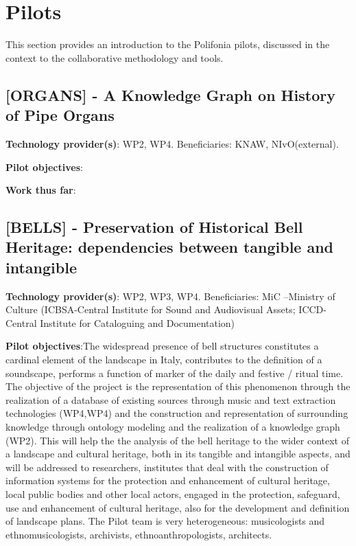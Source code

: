 \chapter{Pilots}\label{ch:pilot}
This section provides an introduction to the Polifonia pilots, discussed in the context to the collaborative methodology and tools.

\section{[ORGANS] - A Knowledge Graph on History of Pipe Organs}\label{sec:pilot:organs}
\textbf{Technology provider(s)}: WP2, WP4. Beneficiaries: KNAW, NIvO(external).

\textbf{Pilot objectives}:

\textbf{Work thus far}:

\section{[BELLS] - Preservation of Historical Bell Heritage: dependencies between tangible and intangible}\label{sec:pilot:bells}

\textbf{Technology provider(s)}: WP2, WP3, WP4. Beneficiaries: MiC –Ministry of Culture (ICBSA-Central Institute for Sound and Audiovisual Assets; ICCD-Central Institute for Cataloguing and Documentation)

\textbf{Pilot objectives}:The widespread presence of bell structures  constitutes a cardinal element of the landscape in Italy, contributes to the definition of a soundscape,  performs a function of marker of the daily and festive / ritual time. The objective of the project is the representation of this  phenomenon through the realization of a database of existing sources through music and text extraction technologies (WP4,WP4) and  the construction and representation of surrounding knowledge  through ontology modeling and the realization of a knowledge graph (WP2). This will help the the analysis of the bell heritage to the wider context of a landscape and cultural heritage, both in its tangible and intangible aspects, and will be addressed to researchers, institutes that deal with the construction of information systems for the protection and enhancement of cultural heritage, local public bodies and other local actors, engaged in the protection, safeguard, use and enhancement of cultural heritage, also for the development and definition of landscape plans. The Pilot team is very heterogeneous: musicologists and ethnomusicologists, archivists, ethnoanthropologists, architects.

